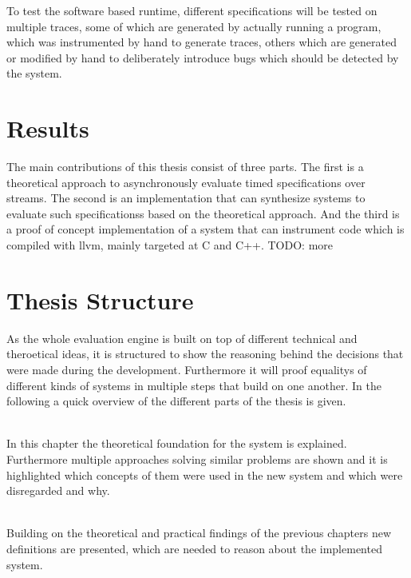 To test the software based runtime, different specifications will be tested on multiple traces, some of which are generated by actually running a program,
which was instrumented by hand to generate traces, others which are generated or modified by hand to deliberately introduce bugs which should be detected by the system.

\section{Results}
\label{sec:intro:results}

The main contributions of this thesis consist of three parts.
The first is a theoretical approach to asynchronously evaluate timed specifications over streams.
The second is an implementation that can synthesize systems to evaluate such specificationss based on the theoretical approach.
And the third is a proof of concept implementation of a system that can instrument code which is compiled with \gls{llvm}, mainly targeted at C and C++.
TODO: more


\section{Thesis Structure}
\label{sec:intro:structure}

As the whole evaluation engine is built on top of different technical and theroetical ideas, it is structured to show
the reasoning behind the decisions that were made during the development.
Furthermore it will proof equalitys of different kinds of systems in multiple steps that build on one another.
In the following a quick overview of the different parts of the thesis is given.

\textbf{} \\[0.2em]

In this chapter the theoretical foundation for the system is explained.
Furthermore multiple approaches solving similar problems are shown and it is highlighted which concepts of them were
used in the new system and which were disregarded and why.


\textbf{} \\[0.2em]

Building on the theoretical and practical findings of the previous chapters new definitions are presented, which are needed to reason about the implemented system.

\textbf{} \\[0.2em]

